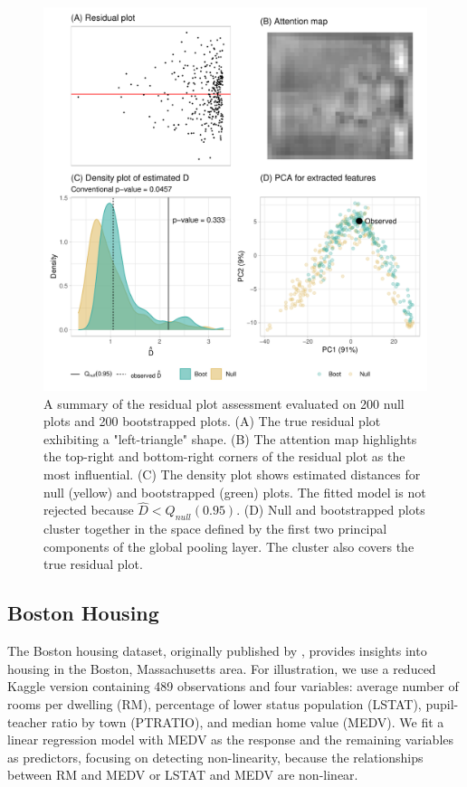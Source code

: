 \documentclass[]{interact}
\theoremstyle{plain}%
\theoremstyle{definition}
\theoremstyle{remark}
\begin{document}
\begin{figure}[!h]

{\centering \includegraphics[width=0.8\linewidth]{paper_files/figure-latex/false-check-1} 

}

\caption{A summary of the residual plot assessment evaluated on 200 null plots and 200 bootstrapped plots. (A) The true residual plot exhibiting a "left-triangle" shape. (B) The attention map highlights the top-right and bottom-right corners of the residual plot as the most influential.  (C) The density plot shows estimated distances for null (yellow) and bootstrapped (green) plots. The fitted model is not rejected because $\hat{D} < Q_{null}(0.95)$. (D) Null and bootstrapped plots cluster together in the space defined by the first two principal components of the global pooling layer. The cluster also covers the true residual plot.}\label{fig:false-check}
\end{figure}

\subsection{Boston Housing}\label{boston-housing}

The Boston housing dataset, originally published by
\citet{harrison1978hedonic}, provides insights into housing in the
Boston, Massachusetts area. For illustration, we use a reduced Kaggle
version containing 489 observations and four variables: average number
of rooms per dwelling (RM), percentage of lower status population
(LSTAT), pupil-teacher ratio by town (PTRATIO), and median home value
(MEDV). We fit a linear regression model with MEDV as the response and
the remaining variables as predictors, focusing on detecting
non-linearity, because the relationships between RM and MEDV or LSTAT
and MEDV are non-linear.
\end{document}
